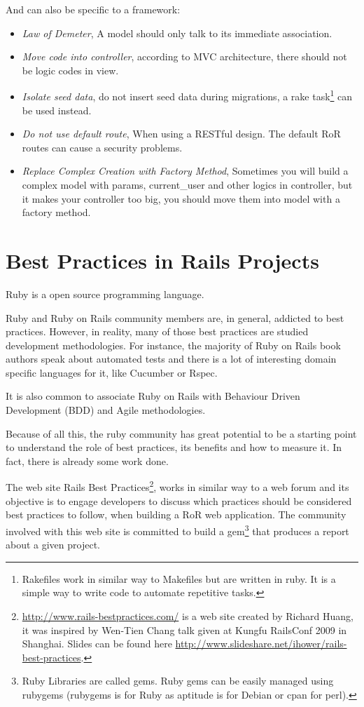 And can also be specific to a framework:
\begin{itemize}
\item \emph{Law of Demeter}, A model should only talk to its immediate association.
\item \emph{Move code into controller}, according to MVC architecture, there should not be logic codes in view.
\item \emph{Isolate seed data}, do not insert seed data during migrations, a 
rake task\footnote{ Rakefiles work in similar way to Makefiles but are written in ruby. It is a simple way to write code to automate repetitive tasks. }
can be used instead.
\item \emph{Do not use default route}, When using a RESTful design. The default RoR routes can cause a security problems.
\item \emph{Replace Complex Creation with Factory Method}, Sometimes you will build a complex model with params, current\_user and other logics in controller, but it makes your controller too big, you should move them into model with a factory method.
\end{itemize}





\section{Best Practices in Rails Projects} \label{sec:ror_best_practives}
Ruby is a open source programming language.

Ruby and Ruby on Rails community members are, in general, addicted to best practices.
However, in reality, many of those best practices are studied development methodologies.
For instance, the majority of Ruby on Rails book authors speak about automated tests
and there is a lot of interesting domain specific languages for it, like Cucumber or Rspec.

It is also common to associate Ruby on Rails with Behaviour Driven Development (BDD) and Agile methodologies.

Because of all this, the ruby community has great potential to be a starting point to understand the role of best practices, its benefits and how to measure it.
In fact, there is already some work done.

The web site
\textsf{Rails Best Practices}\footnote{\url{http://www.rails-bestpractices.com/} is a web site created by Richard Huang,
it was inspired by Wen-Tien Chang talk given at Kungfu RailsConf 2009 in Shanghai. Slides can be found here
\url{http://www.slideshare.net/ihower/rails-best-practices}.},
works in similar way to a web forum and its objective is to engage developers to discuss which practices
should be considered best practices to follow, when building a RoR web application.
The community involved with this web site is committed to build a
gem\footnote{Ruby Libraries are called gems. Ruby gems can be easily managed using rubygems (rubygems is for Ruby as aptitude is for Debian or cpan for perl).}
that produces a report about a given project.

